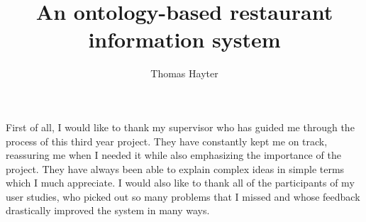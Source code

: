 \documentclass[12pt,BSc,wordcount,twoside]{muthesis}
\begin{document}

\title{An ontology-based restaurant information system}
\author{Thomas Hayter}

\beforeabstract



\afterabstract

First of all, I would like to thank my supervisor who has guided me through the process of this third year project. They have constantly kept me on track, reassuring me when I needed it while also emphasizing the importance of the project. They have always been able to explain complex ideas in simple terms which I much appreciate.
I would also like to thank all of the participants of my user studies, who picked out so many problems that I missed and whose feedback drastically improved the system in many ways.
\afterpreface













\appendix


\end{document}
